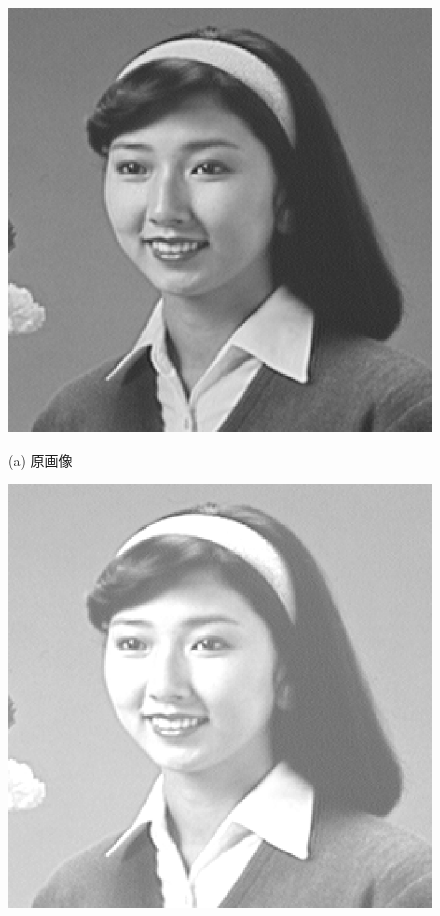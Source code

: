 \begin{figure}[b]
\begin{center}
\begin{minipage}{.38\textwidth}
\begin{center}
\includegraphics[width=.98\textwidth]{fig/hair1.eps}

(a) 原画像
\end{center}
\end{minipage}
\begin{minipage}{.38\textwidth}
\begin{center}
\includegraphics[width=.98\textwidth]{fig/hair1_p50.eps}


\end{center}
\end{minipage}
\end{center}
\end{figure}
